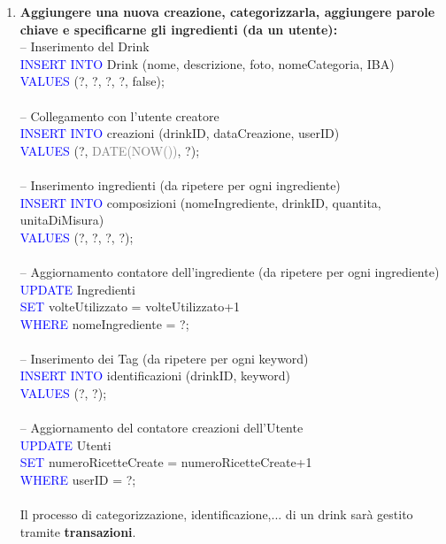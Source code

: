 \documentclass[a4paper,12pt]{report}
\begin{document}
\begin{enumerate}
    \item \textbf{Aggiungere una nuova creazione, categorizzarla, aggiungere parole chiave e specificarne gli ingredienti (da un utente):\\}
        -- Inserimento del Drink\\
        \textcolor{blue}{INSERT INTO} Drink \footnotesize(nome, descrizione, foto, nomeCategoria, IBA)\normalsize\\
        \textcolor{blue}{VALUES} (?, ?, ?, ?, false);
        \\\\
        -- Collegamento con l'utente creatore\\
        \textcolor{blue}{INSERT INTO} creazioni (drinkID, dataCreazione, userID)\\
        \textcolor{blue}{VALUES} (?, \textcolor{gray}{DATE(NOW())}, ?);
        \\\\
        -- Inserimento ingredienti (da ripetere per ogni ingrediente)\\
        \textcolor{blue}{INSERT INTO} composizioni (nomeIngrediente, drinkID, quantita, unitaDiMisura)\\
        \textcolor{blue}{VALUES} (?, ?, ?, ?);
        \\\\
        -- Aggiornamento contatore dell'ingrediente (da ripetere per ogni ingrediente)\\
        \textcolor{blue}{UPDATE} Ingredienti\\
        \textcolor{blue}{SET} volteUtilizzato = volteUtilizzato+1\\
        \textcolor{blue}{WHERE} nomeIngrediente = ?;
        \\\\
        -- Inserimento dei Tag (da ripetere per ogni keyword)\\
        \textcolor{blue}{INSERT INTO} identificazioni (drinkID, keyword)\\
        \textcolor{blue}{VALUES} (?, ?);
        \\\\
        -- Aggiornamento del contatore creazioni dell'Utente\\
        \textcolor{blue}{UPDATE} Utenti\\
        \textcolor{blue}{SET} numeroRicetteCreate = numeroRicetteCreate+1\\
        \textcolor{blue}{WHERE} userID = ?;
        \\\\
        Il processo di categorizzazione, identificazione,... di un drink sarà gestito tramite \textbf{transazioni}. 
    

\end{enumerate}
\end{document}
